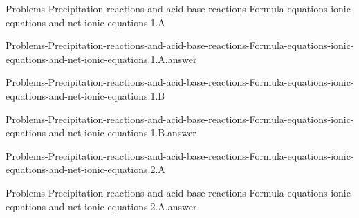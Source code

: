 \documentclass[main.tex]{subfiles}
\newcommand\chapterlabel{}
\begin{document}
\renewcommand\chapterlabel{Ch-electrolytes}
\begin{question}[ID=\the\value{numA}]
{Problems-Precipitation-reactions-and-acid-base-reactions-Formula-equations-ionic-equations-and-net-ionic-equations.1.A}
\end{question}
   \begin{Form}
   \TextField[multiline,backgroundcolor=gray!20,borderwidth=0,width=0.43\textwidth  ,height=115pt, name=\the\value{numA}]  { }\end{Form}
\begin{solution}
{Problems-Precipitation-reactions-and-acid-base-reactions-Formula-equations-ionic-equations-and-net-ionic-equations.1.A.answer}
\hspace{0.1cm}
\end{solution}


\renewcommand\chapterlabel{Ch-electrolytes}
\begin{question}[ID=\the\value{numA}]
{Problems-Precipitation-reactions-and-acid-base-reactions-Formula-equations-ionic-equations-and-net-ionic-equations.1.B}
\end{question}
   \begin{Form}
   \TextField[multiline,backgroundcolor=gray!20,borderwidth=0,width=0.43\textwidth  ,height=115pt, name=\the\value{numA}]  { }\end{Form}
\begin{solution}
{Problems-Precipitation-reactions-and-acid-base-reactions-Formula-equations-ionic-equations-and-net-ionic-equations.1.B.answer}
\hspace{0.1cm}
\end{solution}


\renewcommand\chapterlabel{Ch-electrolytes}
\begin{question}[ID=\the\value{numA}]
{Problems-Precipitation-reactions-and-acid-base-reactions-Formula-equations-ionic-equations-and-net-ionic-equations.2.A}
\end{question}
   \begin{Form}
   \TextField[multiline,backgroundcolor=gray!20,borderwidth=0,width=0.43\textwidth  ,height=115pt, name=\the\value{numA}]  { }\end{Form}
\begin{solution}
{Problems-Precipitation-reactions-and-acid-base-reactions-Formula-equations-ionic-equations-and-net-ionic-equations.2.A.answer}
\hspace{0.1cm}
\end{solution}
\end{document}
